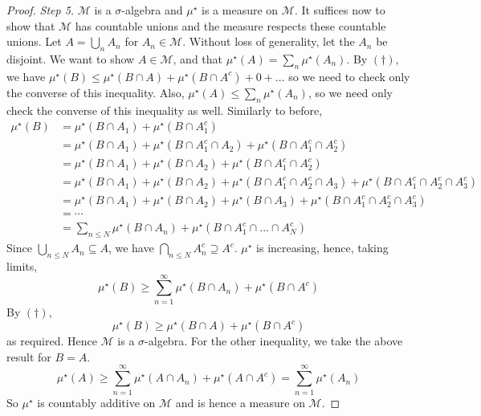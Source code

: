 \begin{proof}
	\emph{Step 5.} \( \mathcal M \) is a \( \sigma \)-algebra and \( \mu^\star \) is a measure on \( \mathcal M \).
	It suffices now to show that \( \mathcal M \) has countable unions and the measure respects these countable unions.
	Let \( A = \bigcup_n A_n \) for \( A_n \in \mathcal M \).
	Without loss of generality, let the \( A_n \) be disjoint.
	We want to show \( A \in \mathcal M \), and that \( \mu^\star(A) = \sum_n \mu^\star(A_n) \).
	By \( (\dagger) \), we have \( \mu^\star(B) \leq \mu^\star(B \cap A) + \mu^\star(B \cap A^c) + 0 + \dots \) so we need to check only the converse of this inequality.
	Also, \( \mu^\star(A) \leq \sum_n \mu^\star(A_n) \), so we need only check the converse of this inequality as well.
	Similarly to before,
	\begin{align*}
		\mu^\star(B) &= \mu^\star(B \cap A_1) + \mu^\star(B \cap A_1^c) \\
		&= \mu^\star(B \cap A_1) + \mu^\star(B \cap A_1^c \cap A_2) + \mu^\star(B \cap A_1^c \cap A_2^c) \\
		&= \mu^\star(B \cap A_1) + \mu^\star(B \cap A_2) + \mu^\star(B \cap A_1^c \cap A_2^c) \\
		&= \mu^\star(B \cap A_1) + \mu^\star(B \cap A_2) + \mu^\star(B \cap A_1^c \cap A_2^c \cap A_3) + \mu^\star(B \cap A_1^c \cap A_2^c \cap A_3^c) \\
		&= \mu^\star(B \cap A_1) + \mu^\star(B \cap A_2) + \mu^\star(B \cap A_3) + \mu^\star(B \cap A_1^c \cap A_2^c \cap A_3^c) \\
		&= \cdots \\
		&= \sum_{n \leq N} \mu^\star(B \cap A_n) + \mu^\star(B \cap A_1^c \cap \dots \cap A_N^c)
	\end{align*}
	Since \( \bigcup_{n \leq N} A_n \subseteq A \), we have \( \bigcap_{n \leq N} A_n^c \supseteq A^c \).
	\( \mu^\star \) is increasing, hence, taking limits,
	\[ \mu^\star(B) \geq \sum_{n=1}^\infty \mu^\star(B \cap A_n) + \mu^\star(B \cap A^c) \]
	By \( (\dagger) \),
	\[ \mu^\star(B) \geq \mu^\star(B \cap A) + \mu^\star(B \cap A^c) \]
	as required.
	Hence \( \mathcal M \) is a \( \sigma \)-algebra.
	For the other inequality, we take the above result for \( B = A \).
	\[ \mu^\star(A) \geq \sum_{n=1}^\infty \mu^\star(A \cap A_n) + \mu^\star(A \cap A^c) = \sum_{n=1}^\infty \mu^\star(A_n) \]
	So \( \mu^\star \) is countably additive on \( \mathcal M \) and is hence a measure on \( \mathcal M \).
\end{proof}


